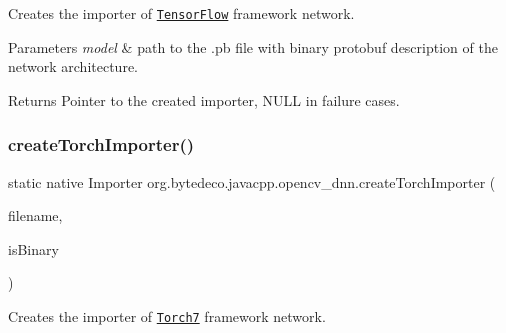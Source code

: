 Creates the importer of \href{http://www.tensorflow.org}{\tt Tensor\+Flow} framework network. 


\begin{DoxyParams}{Parameters}
{\em model} & path to the .pb file with binary protobuf description of the network architecture. \\
\hline
\end{DoxyParams}
\begin{DoxyReturn}{Returns}
Pointer to the created importer, N\+U\+LL in failure cases. 
\end{DoxyReturn}
\mbox{\label{group__dnn_gae0f202e183aadc4ec86abda60b0e6adf}} 
\subsubsection{\texorpdfstring{create\+Torch\+Importer()}{createTorchImporter()}}
{\footnotesize\ttfamily static native Importer org.\+bytedeco.\+javacpp.\+opencv\+\_\+dnn.\+create\+Torch\+Importer (\begin{DoxyParamCaption}\item[{@Str Byte\+Pointer}]{filename,  }\item[{@Cast(\char`\"{}bool\char`\"{}) boolean}]{is\+Binary }\end{DoxyParamCaption})\hspace{0.3cm}{\ttfamily [static]}}



Creates the importer of \href{http://torch.ch}{\tt Torch7} framework network. 


